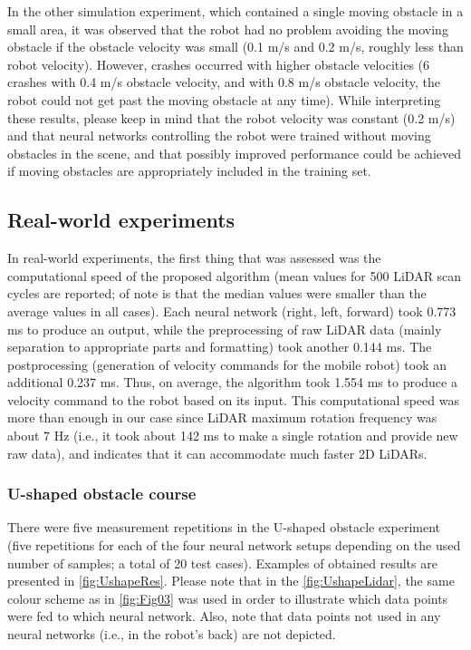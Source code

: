 In the other simulation experiment, which contained a single moving obstacle in a small area, it was observed that the robot had no problem avoiding the moving obstacle if the obstacle velocity was small (0.1 m/s and 0.2 m/s, roughly less than robot velocity). However, crashes occurred with higher obstacle velocities (6 crashes with 0.4 m/s obstacle velocity, and with 0.8 m/s obstacle velocity, the robot could not get past the moving obstacle at any time). While interpreting these results, please keep in mind that the robot velocity was constant (0.2 m/s) and that neural networks controlling the robot were trained without moving obstacles in the scene, and that possibly improved performance could be achieved if moving obstacles are appropriately included in the training set. 

\subsection{Real-world experiments}
\label{sec:RealRes}

In real-world experiments, the first thing that was assessed was the computational speed of the proposed algorithm (mean values for 500 LiDAR scan cycles are reported; of note is that the median values were smaller than the average values in all cases). Each neural network (right, left, forward) took 0.773 ms to produce an output, while the preprocessing of raw LiDAR data (mainly separation to appropriate parts and formatting) took another 0.144 ms. The postprocessing (generation of velocity commands for the mobile robot) took an additional 0.237 ms. Thus, on average, the algorithm took 1.554 ms to produce a velocity command to the robot based on its input. This computational speed was more than enough in our case since LiDAR maximum rotation frequency was about 7 Hz (i.e., it took about 142 ms to make a single rotation and provide new raw data), and indicates that it can accommodate much faster 2D LiDARs.

\subsubsection{U-shaped obstacle course}

There were five measurement repetitions in the U-shaped obstacle experiment (five repetitions for each of the four neural network setups depending on the used number of samples; a total of 20 test cases). Examples of obtained results are presented in \cref{fig:UshapeRes}. Please note that in the \cref{fig:UshapeLidar}, the same colour scheme as in \cref{fig:Fig03} was used in order to illustrate which data points were fed to which neural network. Also, note that data points not used in any neural networks (i.e., in the robot's back) are not depicted.

